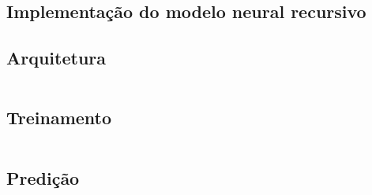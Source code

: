 \begin{apendicesenv}


\partapendices





\chapter{Implementação do modelo neural recursivo} \label{app:implementacaorecursivo}

\section{Arquitetura}

\inputminted[linenos,fontsize=\scriptsize]{python}{postextuais/recursive_model_network.py}

\section{Treinamento}

\inputminted[linenos,fontsize=\scriptsize]{python}{postextuais/recursive_model_train.py}

\section{Predição}


\end{apendicesenv}
